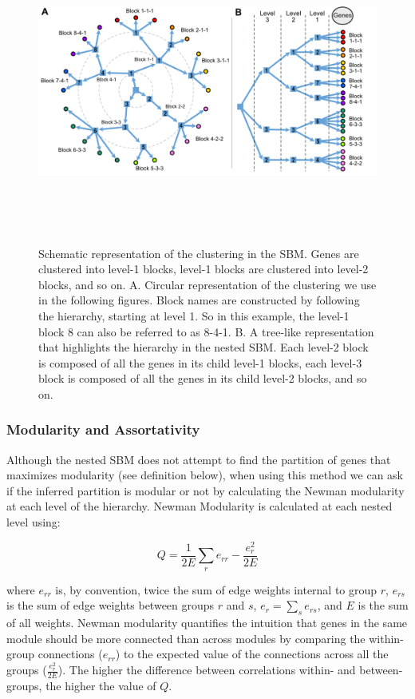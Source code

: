 \documentclass[
]{article}
\begin{document}
\begin{figure}
\centering
\includegraphics[width=\textwidth,height=10cm]{figures/SBM_panel_diagram.png}
\caption{Schematic representation of the clustering in the SBM. Genes
are clustered into level-1 blocks, level-1 blocks are clustered into
level-2 blocks, and so on. A. Circular representation of the clustering
we use in the following figures. Block names are constructed by
following the hierarchy, starting at level 1. So in this example, the
level-1 block 8 can also be referred to as 8-4-1. B. A tree-like
representation that highlights the hierarchy in the nested SBM. Each
level-2 block is composed of all the genes in its child level-1 blocks,
each level-3 block is composed of all the genes in its child level-2
blocks, and so on.}\label{fig:SBM_diagram}
\end{figure}

\subsubsection{Modularity and
Assortativity}\label{modularity-and-assortativity}

Although the nested SBM does not attempt to find the partition of genes
that maximizes modularity (see definition below), when using this method
we can ask if the inferred partition is modular or not by calculating
the Newman modularity at each level of the hierarchy. Newman Modularity
is calculated at each nested level using:

\[
Q = \frac{1}{2E} \sum_r e_{rr} - \frac{e_{r}^2}{2E}
\]

where \(e_{rr}\) is, by convention, twice the sum of edge weights
internal to group \(r\), \(e_{rs}\) is the sum of edge weights between
groups \(r\) and \(s\), \(e_{r} = \sum_s  e_{rs}\), and \(E\) is the sum
of all weights. Newman modularity quantifies the intuition that genes in
the same module should be more connected than across modules by
comparing the within-group connections (\(e_{rr}\)) to the expected
value of the connections across all the groups (\(\frac{e_{r}^2}{2E}\)).
The higher the difference between correlations within- and
between-groups, the higher the value of \(Q\).
\end{document}
